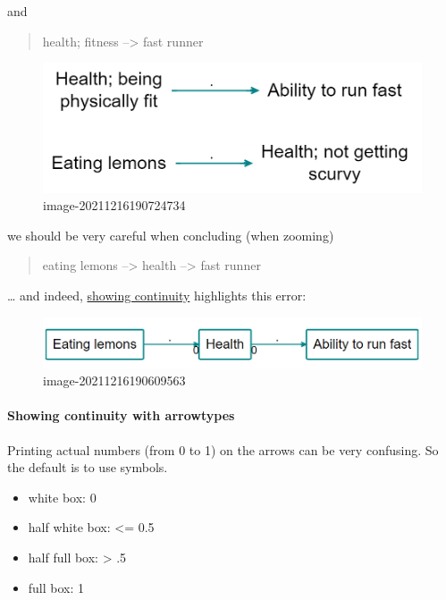 \documentclass[
]{book}
\providecommand{\tightlist}{%
  \setlength{\itemsep}{0pt}\setlength{\parskip}{0pt}}
\begin{document}
and

\begin{quote}
health; fitness --\textgreater{} fast runner
\end{quote}

\begin{figure}
\centering
\includegraphics[width=6.77083in,height=\textheight]{_assets/image-20211216190724734.png}
\caption{image-20211216190724734}
\end{figure}

we should be very careful when concluding (when zooming)

\begin{quote}
eating lemons --\textgreater{} health --\textgreater{} fast runner
\end{quote}

\ldots{} and indeed, \href{https://causalmap.shinyapps.io/CM2test/?s=416}{showing continuity} highlights this error:

\begin{figure}
\centering
\includegraphics[width=6.77083in,height=\textheight]{_assets/image-20211216190609563.png}
\caption{image-20211216190609563}
\end{figure}

\hypertarget{showing-continuity-with-arrowtypes-1}{%
\paragraph{Showing continuity with arrowtypes}\label{showing-continuity-with-arrowtypes-1}}

Printing actual numbers (from 0 to 1) on the arrows can be very confusing. So the default is to use symbols.

\begin{itemize}
\tightlist
\item
  white box: 0
\item
  half white box: \textless= 0.5
\item
  half full box: \textgreater{} .5
\item
  full box: 1
\end{itemize}
\end{document}
